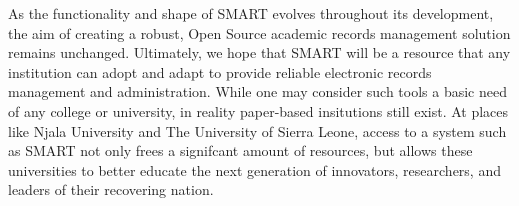 \documentclass[12pt]{article}
\begin{document}
As the functionality and shape of SMART evolves throughout its development, the aim of creating a robust, Open Source academic records management solution remains unchanged. Ultimately, we hope that SMART will be a resource that any institution can adopt and adapt to provide reliable electronic records management and administration. While one may consider such tools a basic need of any college or university, in reality paper-based insitutions still exist. At places like Njala University and The University of Sierra Leone, access to a system such as SMART not only frees a signifcant amount of resources, but allows these universities to better educate the next generation of innovators, researchers, and leaders of their recovering nation.

\begin{appendices}

\end{appendices}
\end{document}
